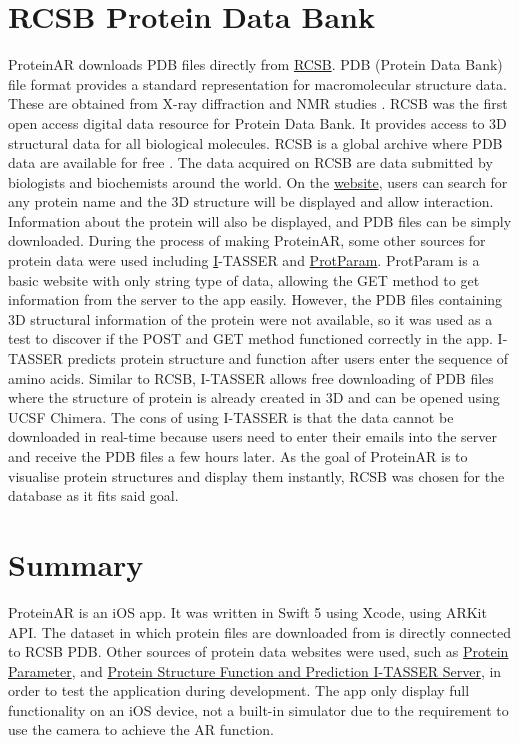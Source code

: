\section{RCSB Protein Data Bank}
ProteinAR downloads PDB files directly from \href{https://www.rcsb.org/}{RCSB}. PDB (Protein Data Bank) file format provides a standard representation for macromolecular structure data. These are obtained from X-ray diffraction and NMR studies \parencite{noauthor_rcsb_nodate}.
RCSB was the first open access digital data resource for Protein Data Bank. It provides access to 3D structural data for all biological molecules. RCSB is a global archive where PDB data are available for free \parencite{noauthor_rcsb_nodate}. The data acquired on RCSB are data submitted by biologists and biochemists around the world. On the \href{https://www.rcsb.org/}{website}, users can search for any protein name and the 3D structure will be displayed and allow interaction. Information about the protein will also be displayed, and PDB files can be simply downloaded.
During the process of making ProteinAR, some other sources for protein data were used including \href{ https://zhanglab.ccmb.med.umich.edu/I-TASSER/}I-TASSER and \href{https://web.expasy.org/protparam/} {ProtParam}. 
ProtParam is a basic website with only string type of data, allowing the GET method to get information from the server to the app easily. However, the PDB files containing 3D structural information of the protein were not available, so it was used as a test to discover if the POST and GET method functioned correctly in the app.
I-TASSER predicts protein structure and function after users enter the sequence of amino acids. Similar to RCSB, I-TASSER allows free downloading of PDB files where the structure of protein is already created in 3D and can be opened using UCSF Chimera. The cons of using I-TASSER is that the data cannot be downloaded in real-time because users need to enter their emails into the server and receive the PDB files a few hours later. 
As the goal of ProteinAR is to visualise protein structures and display them instantly, RCSB was chosen for the database as it fits said goal.  

\section{Summary}
ProteinAR is an iOS app. It was written in Swift 5 using Xcode, using ARKit API. The dataset in which protein files are downloaded from is directly connected to RCSB PDB. Other sources of protein data websites were used, such as \href{https://web.expasy.org/protparam/} {Protein Parameter}, and \href{https://zhanglab.ccmb.med.umich.edu/I-TASSER/}{Protein Structure Function and Prediction I-TASSER Server}, in order to test the application during development.
The app only display full functionality on an iOS device, not a built-in simulator due to the requirement to use the camera to achieve the AR function.
